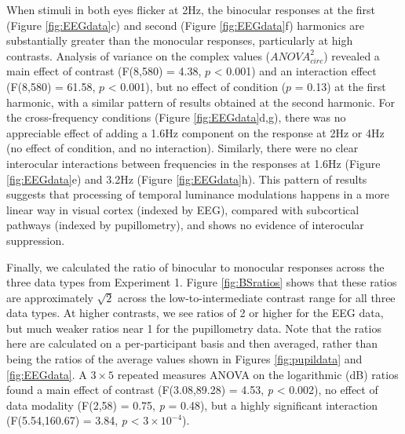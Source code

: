 \documentclass[
]{article}
\begin{document}
When stimuli in both eyes flicker at 2Hz, the binocular responses at the first (Figure \ref{fig:EEGdata}c) and second (Figure \ref{fig:EEGdata}f) harmonics are substantially greater than the monocular responses, particularly at high contrasts. Analysis of variance on the complex values (\(ANOVA^2_{circ}\)) revealed a main effect of contrast (F(8,580) = 4.38, \(p\) \textless{} 0.001) and an interaction effect (F(8,580) = 61.58, \(p\) \textless{} 0.001), but no effect of condition (\(p\) = 0.13) at the first harmonic, with a similar pattern of results obtained at the second harmonic. For the cross-frequency conditions (Figure \ref{fig:EEGdata}d,g), there was no appreciable effect of adding a 1.6Hz component on the response at 2Hz or 4Hz (no effect of condition, and no interaction). Similarly, there were no clear interocular interactions between frequencies in the responses at 1.6Hz (Figure \ref{fig:EEGdata}e) and 3.2Hz (Figure \ref{fig:EEGdata}h). This pattern of results suggests that processing of temporal luminance modulations happens in a more linear way in visual cortex (indexed by EEG), compared with subcortical pathways (indexed by pupillometry), and shows no evidence of interocular suppression.

Finally, we calculated the ratio of binocular to monocular responses across the three data types from Experiment 1. Figure \ref{fig:BSratios} shows that these ratios are approximately \(\sqrt2\) across the low-to-intermediate contrast range for all three data types. At higher contrasts, we see ratios of 2 or higher for the EEG data, but much weaker ratios near 1 for the pupillometry data. Note that the ratios here are calculated on a per-participant basis and then averaged, rather than being the ratios of the average values shown in Figures \ref{fig:pupildata} and \ref{fig:EEGdata}. A \(3 \times 5\) repeated measures ANOVA on the logarithmic (dB) ratios found a main effect of contrast (F(3.08,89.28) = 4.53, \emph{p} \textless{} 0.002), no effect of data modality (F(2,58) = 0.75, \emph{p} = 0.48), but a highly significant interaction (F(5.54,160.67) = 3.84, \emph{p} \textless{} \ensuremath{3\times 10^{-4}}).
\end{document}

